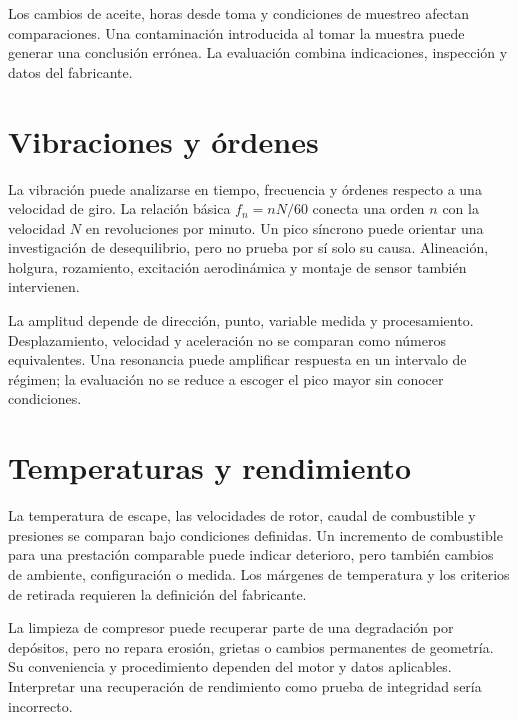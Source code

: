 Los cambios de aceite, horas desde toma y condiciones de muestreo afectan comparaciones. Una contaminación introducida al tomar la muestra puede generar una conclusión errónea. La evaluación combina indicaciones, inspección y datos del fabricante.
\section{Vibraciones y órdenes}
La vibración puede analizarse en tiempo, frecuencia y órdenes respecto a una velocidad de giro. La relación básica $f_n=nN/60$ conecta una orden $n$ con la velocidad $N$ en revoluciones por minuto. Un pico síncrono puede orientar una investigación de desequilibrio, pero no prueba por sí solo su causa. Alineación, holgura, rozamiento, excitación aerodinámica y montaje de sensor también intervienen.

La amplitud depende de dirección, punto, variable medida y procesamiento. Desplazamiento, velocidad y aceleración no se comparan como números equivalentes. Una resonancia puede amplificar respuesta en un intervalo de régimen; la evaluación no se reduce a escoger el pico mayor sin conocer condiciones.
\section{Temperaturas y rendimiento}
La temperatura de escape, las velocidades de rotor, caudal de combustible y presiones se comparan bajo condiciones definidas. Un incremento de combustible para una prestación comparable puede indicar deterioro, pero también cambios de ambiente, configuración o medida. Los márgenes de temperatura y los criterios de retirada requieren la definición del fabricante.

La limpieza de compresor puede recuperar parte de una degradación por depósitos, pero no repara erosión, grietas o cambios permanentes de geometría. Su conveniencia y procedimiento dependen del motor y datos aplicables. Interpretar una recuperación de rendimiento como prueba de integridad sería incorrecto.
